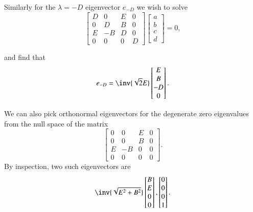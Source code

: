 {Similarly for the \(\lambda = -D\) eigenvector \(e_{-D}\) we wish to solve
%
\begin{equation}\label{eqn:relElectroDynProblemSet2:630}
\begin{bmatrix}
D & 0 & E & 0 \\
0 & D & B & 0 \\
E & -B & D & 0 \\
0 & 0 & 0 & D
\end{bmatrix}
\begin{bmatrix}
a \\
b \\
c \\
d
\end{bmatrix}
 = 0,
\end{equation}

and find that
%
\begin{equation}\label{eqn:relElectroDynProblemSet2:650}
e_{-D} =
\inv{\sqrt{2}E}
\begin{bmatrix}
E \\
B \\
-D \\
0
\end{bmatrix}.
\end{equation}

We can also pick orthonormal eigenvectors for the degenerate zero eigenvalues from the null space of the matrix
%
\begin{equation}\label{eqn:relElectroDynProblemSet2:670}
\begin{bmatrix}
0 & 0 & E & 0 \\
0 & 0 & B & 0 \\
E & -B & 0 & 0 \\
0 & 0 & 0 & 0
\end{bmatrix}.
\end{equation}
By inspection, two such eigenvectors are
\begin{equation}\label{eqn:relElectroDynProblemSet2:690}
\inv{\sqrt{E^2 + B^2}}
\begin{bmatrix}
B \\
E \\
0 \\
0
\end{bmatrix},
\begin{bmatrix}
0 \\
0 \\
0 \\
1
\end{bmatrix}.
\end{equation}

}
